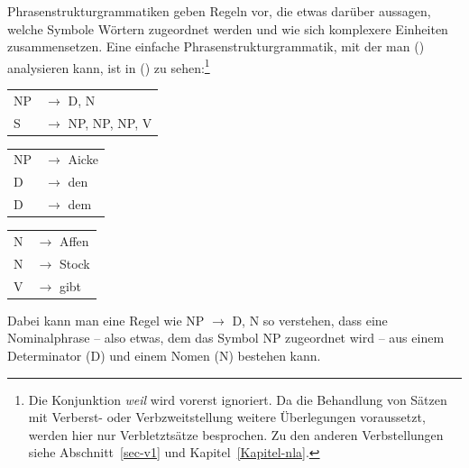 Phrasenstrukturgrammatiken geben Regeln vor, die etwas darüber aussagen, welche Symbole Wörtern
zugeordnet werden und wie sich komplexere Einheiten zusammensetzen. Eine einfache Phrasenstrukturgrammatik,
mit der man () analysieren kann, ist in () zu sehen:\footnote{
  Die Konjunktion \emph{weil} wird vorerst ignoriert. Da die Behandlung von Sätzen mit Verberst- oder
  Verbzweitstellung weitere Überlegungen voraussetzt, werden hier nur Verbletztsätze besprochen.
  Zu den anderen Verbstellungen siehe Abschnitt~\ref{sec-v1} und Kapitel~\ref{Kapitel-nla}.%
}
\ea
\label{bsp-grammatik-psg}
\begin{tabular}[t]{@{}l@{ }l}
{NP} & {$\to$ D, N}\\          
{S}  & {$\to$ NP, NP, NP, V}
\end{tabular}\hspace{2cm}%
\begin{tabular}[t]{@{}l@{ }l}
{NP} & {$\to$ Aicke}\\
{D}  & {$\to$ den}\\
{D}  & {$\to$ dem}\\
\end{tabular}\hspace{8mm}
\begin{tabular}[t]{@{}l@{ }l}
{N} & {$\to$ Affen}\\
{N} & {$\to$ Stock}\\
{V} & {$\to$ gibt}\\
\end{tabular}
\z
Dabei kann man eine Regel wie NP $\to$\is{$\to$} D, N so verstehen, dass eine Nominalphrase -- also etwas,
dem das Symbol NP zugeordnet wird -- aus einem Determinator (D) und einem Nomen (N) bestehen kann.

